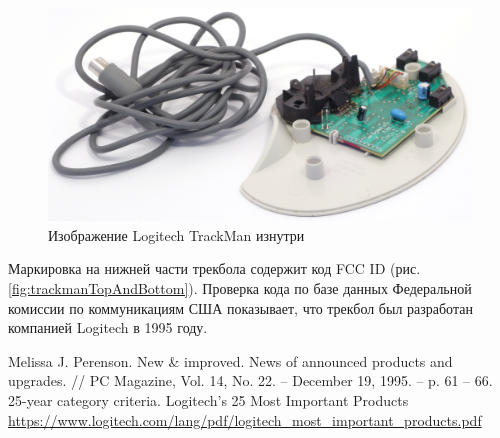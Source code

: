 \documentclass[11pt, a4paper]{article}
\begin{document}
\begin{figure}[h]
    \centering
    \includegraphics[scale=0.6]{1995_logitech_trackman/inside_30.jpg}
    \caption{Изображение Logitech TrackMan изнутри}
    \label{fig:trackmanInside}
\end{figure}

Маркировка на нижней части трекбола содержит код FCC ID (рис. \ref{fig:trackmanTopAndBottom}).
Проверка кода по базе данных Федеральной комиссии по коммуникациям США показывает, что трекбол был разработан компанией Logitech в 1995 году.


\begin{thebibliography}{9}
 Melissa J. Perenson. New \& improved. News of announced products and upgrades. // PC Magazine, Vol. 14, No. 22. -- December 19, 1995. -- p. 61 -- 66.
 25-year category criteria. Logitech’s 25 Most Important Products \url{https://www.logitech.com/lang/pdf/logitech_most_important_products.pdf}
\end{thebibliography}
\end{document}
